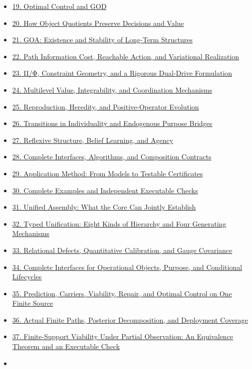 \documentclass[
  english,
  11pt,
  oneside]{book}
\begin{document}
\begin{itemize}
  \hyperref[ch-18]{18. Feasible Futures, Value, and Purpose Bridges}
\item
  \hyperref[ch-19]{19. Optimal Control and GOD}
\item
  \hyperref[ch-20]{20. How Object Quotients Preserve Decisions and Value}
\item
  \hyperref[ch-21]{21. GOA: Existence and Stability of Long-Term Structures}
\item
  \hyperref[ch-22]{22. Path Information Cost, Reachable Action, and Variational Realization}
\item
  \hyperref[ch-23]{23. Π/Φ, Constraint Geometry, and a Rigorous Dual-Drive Formulation}
\item
  \hyperref[ch-24]{24. Multilevel Value, Integrability, and Coordination Mechanisms}
\item
  \hyperref[ch-25]{25. Reproduction, Heredity, and Positive-Operator Evolution}
\item
  \hyperref[ch-26]{26. Transitions in Individuality and Endogenous Purpose Bridges}
\item
  \hyperref[ch-27]{27. Reflexive Structure, Belief Learning, and Agency}
\item
  \hyperref[ch-28]{28. Complete Interfaces, Algorithms, and Composition Contracts}
\item
  \hyperref[ch-29]{29. Application Method: From Models to Testable Certificates}
\item
  \hyperref[ch-30]{30. Complete Examples and Independent Executable Checks}
\item
  \hyperref[ch-31]{31. Unified Assembly: What the Core Can Jointly Establish}
\item
  \hyperref[ch-32]{32. Typed Unification: Eight Kinds of Hierarchy and Four Generating Mechanisms}
\item
  \hyperref[ch-33]{33. Relational Defects, Quantitative Calibration, and Gauge Covariance}
\item
  \hyperref[ch-34]{34. Complete Interfaces for Operational Objects, Purpose, and Conditional Lifecycles}
\item
  \hyperref[ch-35]{35. Prediction, Carriers, Viability, Repair, and Optimal Control on One Finite Source}
\item
  \hyperref[ch-36]{36. Actual Finite Paths, Posterior Decomposition, and Deployment Coverage}
\item
  \hyperref[ch-37]{37. Finite-Support Viability Under Partial Observation: An Equivalence Theorem and an Executable Check}
\item

\end{itemize}
\end{document}
